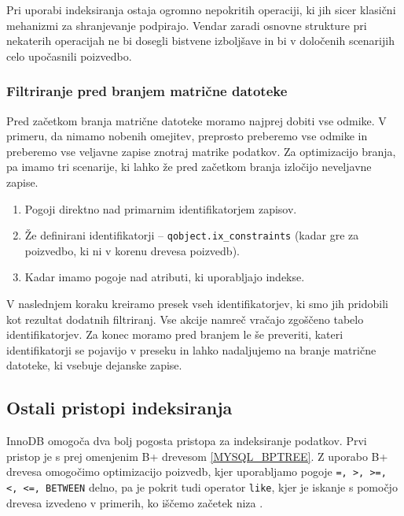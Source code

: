 \documentclass[a4paper,12pt,openright]{book}
\begin{document}
        \noindent
        Pri uporabi indeksiranja ostaja ogromno nepokritih operaciji, ki jih sicer klasični mehanizmi za shranjevanje podpirajo. Vendar zaradi osnovne strukture pri nekaterih operacijah ne bi dosegli bistvene izboljšave in bi v določenih scenarijih celo upočasnili poizvedbo.

        \subsubsection{Filtriranje pred branjem matrične datoteke}

        Pred začetkom branja matrične datoteke moramo najprej dobiti vse odmike. V primeru, da nimamo nobenih omejitev, preprosto preberemo vse odmike in preberemo vse veljavne zapise znotraj matrike podatkov. Za optimizacijo branja, pa imamo tri scenarije, ki lahko že pred začetkom branja izločijo neveljavne zapise.

        \newpage
        \begin{enumerate}
            \item Pogoji direktno nad primarnim identifikatorjem zapisov.
            \item Že definirani identifikatorji – {\tt qobject.ix\_constraints} (kadar gre za poizvedbo, ki ni v korenu drevesa poizvedb).
            \item Kadar imamo pogoje nad atributi, ki uporabljajo indekse.
        \end{enumerate}

        \noindent
        V naslednjem koraku kreiramo presek vseh identifikatorjev, ki smo jih pridobili kot rezultat dodatnih filtriranj. Vse akcije namreč vračajo zgoščeno tabelo identifikatorjev. Za konec moramo pred branjem le še preveriti, kateri identifikatorji se pojavijo v preseku in lahko nadaljujemo na branje matrične datoteke, ki vsebuje dejanske zapise.

        \subsection{Ostali pristopi indeksiranja}

        InnoDB omogoča dva bolj pogosta pristopa za indeksiranje podatkov. Prvi pristop je s prej omenjenim B+ drevesom \ref{MYSQL_BPTREE}. Z uporabo B+ drevesa omogočimo optimizacijo poizvedb, kjer uporabljamo pogoje {\tt =, >, >=, <, <=, BETWEEN} delno, pa je pokrit tudi operator {\tt like}, kjer je iskanje s pomočjo drevesa izvedeno v primerih, ko iščemo začetek niza \cite{TREE_HASH_MYSQL}.
\end{document}
